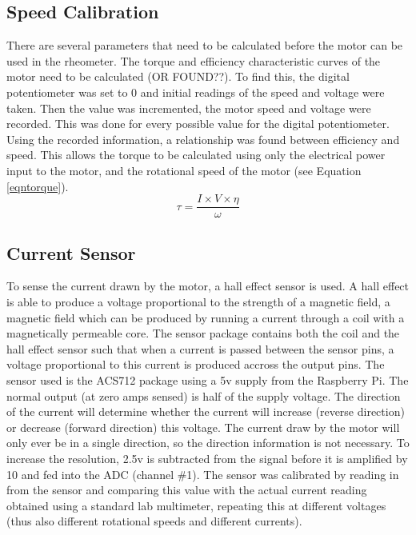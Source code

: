 \documentclass[twoside,a4]{report}
\def\br{\newline \newline \noindent}
\begin{document}
	
	
	\subsection{Speed Calibration} %
	There are several parameters that need to be calculated before the motor can be used in the rheometer. The torque and efficiency characteristic curves of the motor need to be calculated (OR FOUND??). To find this, the digital potentiometer was set to 0 and initial readings of the speed and voltage were taken. Then the value was incremented, the motor speed and voltage were recorded. This was done for every possible value for the digital potentiometer. Using the recorded information, a relationship was found between efficiency and speed. This allows the torque to be calculated using only the electrical power input to the motor, and the rotational speed of the motor (see Equation \ref{eqntorque}).
	\begin{equation}
	\tau = \frac{I \times V \times \eta}{\omega}
	\label{eqntorque}
	\end{equation}
	
	\subsection{Current Sensor}
	To sense the current drawn by the motor, a hall effect sensor is used. A hall effect is able to produce a voltage proportional to the strength of a magnetic field, a magnetic field which can be produced by running a current through a coil with a magnetically permeable core. The sensor package contains both the coil and the hall effect sensor such that when a current is passed between the sensor pins, a voltage proportional to this current is produced accross the output pins. The sensor used is the ACS712 package using a 5v supply from the Raspberry Pi. The normal output (at zero amps sensed) is half of the supply voltage. The direction of the current will determine whether the current will increase (reverse direction) or decrease (forward direction) this voltage. \br
	The current draw by the motor will only ever be in a single direction, so the direction information is not necessary. To increase the resolution, 2.5v is subtracted from the signal before it is amplified by 10 and fed into the ADC (channel \#1). \br
	The sensor was calibrated by reading in from the sensor and comparing this value with the actual current reading obtained using a standard lab multimeter, repeating this at different voltages (thus also different rotational speeds and different currents). \br
	[RESULTS AND SUCH]
	
\end{document}
